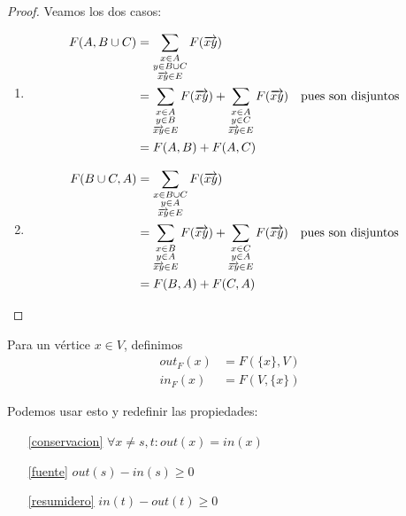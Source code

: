 \begin{proof}
  Veamos los dos casos:
  \begin{enumerate}
  \item
    \begin{align}
      F(A, B \cup C)
      &= \sum_{\substack{x \in A \\ y \in B \cup C \\ \overrightarrow{xy} \in E}} F(\overrightarrow{xy})\\
      &= \sum_{\substack{x \in A \\ y \in B \\ \overrightarrow{xy} \in E}} F(\overrightarrow{xy})
      + \sum_{\substack{x \in A \\ y \in C \\ \overrightarrow{xy} \in E}} F(\overrightarrow{xy}) && \text{pues son disjuntos}\\
      &= F(A,B) + F(A,C)
    \end{align}

  \item
    \begin{align}
      F(B \cup C, A)
      &= \sum_{\substack{x \in B \cup C \\ y \in A \\ \overrightarrow{xy} \in E}} F(\overrightarrow{xy})\\
      &= \sum_{\substack{x \in B \\ y \in A \\ \overrightarrow{xy} \in E}} F(\overrightarrow{xy})
      + \sum_{\substack{x \in C \\ y \in A \\ \overrightarrow{xy} \in E}} F(\overrightarrow{xy}) && \text{pues son disjuntos}\\
      &= F(B,A) + F(C,A)
    \end{align}
  \end{enumerate}
\end{proof}

\begin{definition}\label{in/out}
  Para un vértice $x \in V$, definimos
\begin{align}
  out_{F}(x) &= F(\{x\}, V)\\
  in_{F}(x) &= F(V, \{x\})
\end{align}
\end{definition}

Podemos usar esto y redefinir las propiedades:
\begin{itemize}
  \item[\ref{conservacion}] $\forall x \neq s,t \colon out(x) = in(x)$
  \item[\ref{fuente}] $out(s) - in(s) \ge 0$
  \item[\ref{resumidero}] $in(t) - out(t) \ge 0$
\end{itemize}

